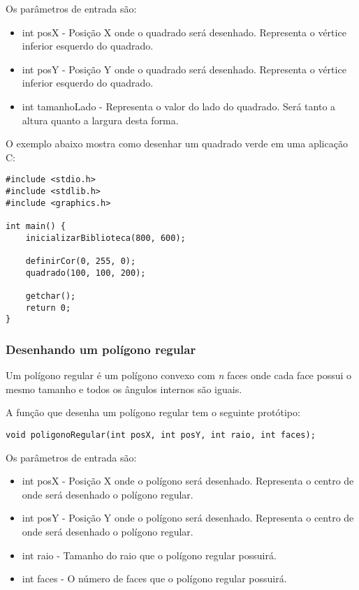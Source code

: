\documentclass[12pt, %
openright,
oneside, %
a4paper,    %
brazil]{facom-ufu-abntex2}
\begin{document}
Os parâmetros de entrada são:

\begin{itemize}
    \item int posX - Posição X onde o quadrado será desenhado. Representa o vértice inferior esquerdo do quadrado.
    \item int posY - Posição Y onde o quadrado será desenhado. Representa o vértice inferior esquerdo do quadrado.
    \item int tamanhoLado - Representa o valor do lado do quadrado. Será tanto a altura quanto a largura desta forma.
\end{itemize}

O exemplo abaixo mostra como desenhar um quadrado verde em uma aplicação C:

\begin{lstlisting}
#include <stdio.h>
#include <stdlib.h>
#include <graphics.h>

int main() {
    inicializarBiblioteca(800, 600);

    definirCor(0, 255, 0);
    quadrado(100, 100, 200);

    getchar();
    return 0;
}
\end{lstlisting}

\subsubsection{Desenhando um polígono regular}
Um polígono regular é um polígono convexo com \textit{n} faces onde cada face possui o mesmo tamanho e todos os ângulos internos são iguais.

A função que desenha um polígono regular tem o seguinte protótipo:

\begin{lstlisting}
void poligonoRegular(int posX, int posY, int raio, int faces);
\end{lstlisting}

Os parâmetros de entrada são:

\begin{itemize}
    \item int posX - Posição X onde o polígono será desenhado. Representa o centro de onde será desenhado o polígono regular.
    \item int posY - Posição Y onde o polígono será desenhado. Representa o centro de onde será desenhado o polígono regular.
    \item int raio - Tamanho do raio que o polígono regular possuirá.
    \item int faces - O número de faces que o polígono regular possuirá.
\end{itemize}
\end{document}
